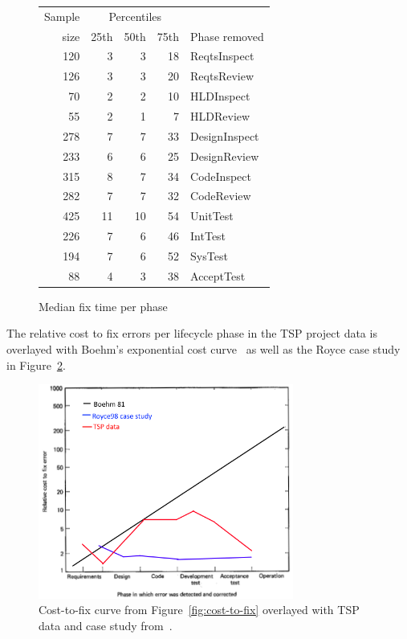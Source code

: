 \documentclass{sig-alternate}
\newcommand{\fig}[1]{Figure~\ref{fig:#1}}
\begin{document}
\begin{figure}[!ht]
\begin{center}
\begin{tabular}{r|rrr|l}
  Sample&\multicolumn{3}{c|}{Percentiles}\\ 
size & 25th & 50th & 75th & Phase removed \\
\hline
120 & 3 & 3 & 18 & ReqtsInspect \\
126 & 3 & 3 & 20 & ReqtsReview \\
70 & 2 & 2 & 10 & HLDInspect \\
 55 &    2 &    1&    7&HLDReview \\

278&    7&    7&   33&DesignInspect \\
233&    6&    6&   25&DesignReview \\

315&    8&    7&   34&CodeInspect \\ 
282&    7&    7&   32&CodeReview\\ 

425&   11&   10&   54&UnitTest \\ 
226&    7&    6&   46&IntTest \\ 
194&    7&    6&   52&SysTest\\ 
 88&    4&    3&   38&AcceptTest\\
\end{tabular}
\end{center}
\caption{Median fix time per phase}
\label{fig:fix-time-per-phase}
\end{figure}


The relative cost to fix errors per lifecycle phase in the TSP project data is overlayed with Boehm's exponential cost curve~\cite{Boehm81} as well as the Royce case study~\cite{Royce98} in \fig{cost-to-fix-tsp}.

\begin{figure}[!ht]
 \includegraphics[width=3.3in]{boehm_overlay.png}
 \caption{Cost-to-fix curve from \fig{cost-to-fix} overlayed with TSP data and case study from~\cite{Royce98}.}
 \label{fig:cost-to-fix-tsp}
 \end{figure}
 
\end{document}
